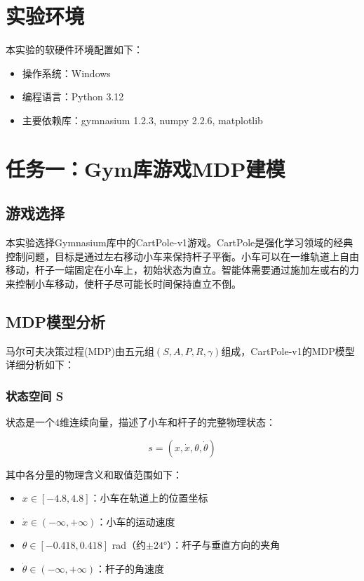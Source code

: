 \documentclass[12pt,a4paper]{article}
\begin{document}
\section{实验环境}

本实验的软硬件环境配置如下：

\begin{itemize}
    \item 操作系统：Windows
    \item 编程语言：Python 3.12
    \item 主要依赖库：gymnasium 1.2.3, numpy 2.2.6, matplotlib

\end{itemize}

\section{任务一：Gym库游戏MDP建模}

\subsection{游戏选择}

本实验选择Gymnasium库中的CartPole-v1游戏。CartPole是强化学习领域的经典控制问题，目标是通过左右移动小车来保持杆子平衡。小车可以在一维轨道上自由移动，杆子一端固定在小车上，初始状态为直立。智能体需要通过施加左或右的力来控制小车移动，使杆子尽可能长时间保持直立不倒。

\subsection{MDP模型分析}

马尔可夫决策过程(MDP)由五元组$(S, A, P, R, \gamma)$组成，CartPole-v1的MDP模型详细分析如下：

\subsubsection{状态空间 S}

状态是一个4维连续向量，描述了小车和杆子的完整物理状态：

\begin{equation}
s = (x, \dot{x}, \theta, \dot{\theta})
\end{equation}

其中各分量的物理含义和取值范围如下：

\begin{itemize}
    \item $x \in [-4.8, 4.8]$：小车在轨道上的位置坐标
    \item $\dot{x} \in (-\infty, +\infty)$：小车的运动速度
    \item $\theta \in [-0.418, 0.418]$ rad（约$\pm 24°$）：杆子与垂直方向的夹角
    \item $\dot{\theta} \in (-\infty, +\infty)$：杆子的角速度
\end{itemize}
\end{document}
